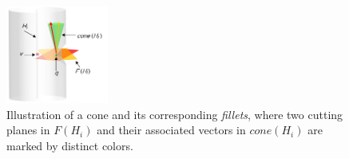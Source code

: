 {%



\begin{figure}[b]
  \centering
  \includegraphics[width=0.3\textwidth]{figs/cone-fillet.png}
  \caption{\label{fig:fillets}%
           Illustration of a cone and its corresponding \emph{fillets}, where two cutting planes in $F(H_i)$ and their associated vectors in $cone(H_i)$ are marked by distinct colors.}
\end{figure}


}
